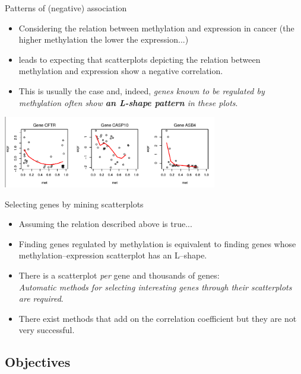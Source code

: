 \documentclass[handout]{beamer}
\begin{document}
\begin{frame}{Patterns of (negative) association}
	\begin{itemize}
		\item Considering the relation between methylation and expression in cancer (the higher methylation the lower the expression...)
		\item leads to expecting that scatterplots depicting the relation between methylation and expression show a negative correlation.
		\item This is usually the case and, indeed, \textit{genes known to be regulated by methylation often show \textbf{an L-shape pattern} in these plots}.
	\end{itemize}
	\begin{center}
		\includegraphics[width=0.7\textwidth]{./images/Lshapes1.png}
	\end{center}
\end{frame}

\begin{frame}{Selecting genes by mining scatterplots}
	\begin{itemize}
		\item Assuming the relation described above is true...
		\item Finding genes regulated by methylation is equivalent to finding genes whose methylation--expression scatterplot has an L--shape.
		\item There is a scatterplot \emph{per} gene and thousands of genes:\\ {\emph{Automatic methods for selecting interesting genes through their scatterplots are required}}.
		\item There exist methods  that add on the correlation coefficient but they are not very successful.
	\end{itemize}
\end{frame}


\subsection{Objectives}
\end{document}
